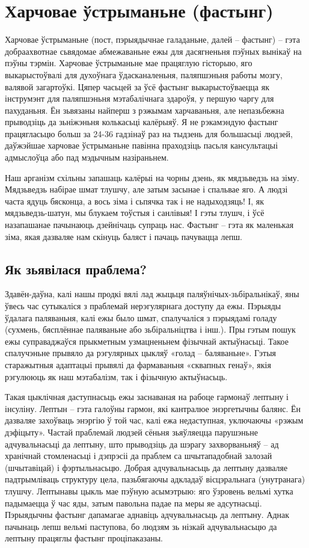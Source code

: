 \chapter{Харчовае ўстрыманьне (фастынг)}

Харчовае ўстрыманьне (пост, пэрыядычнае галаданьне, далей – фастынг) – гэта добраахвотнае сьвядомае абмежаваньне ежы для дасягненьня пэўных вынікаў на пэўны тэрмін. Харчовае ўстрыманьне мае працяглую гісторыю, яго выкарыстоўвалі для духоўнага ўдасканаленьня, паляпшэньня работы мозгу, валявой загартоўкі. Цяпер часьцей за ўсё фастынг выкарыстоўваецца як інструмэнт для паляпшэньня мэтабалічнага здароўя, у першую чаргу для пахуданьня. Ён зьвязаны найперш з рэжымам харчаваньня, але непазьбежна прыводзіць да зьніжэньня колькасьці калёрыяў. Я не рэкамэндую фастынг працягласьцю больш за 24-36 гадзінаў раз на тыдзень для большасьці людзей, даўжэйшае харчовае ўстрыманьне павінна праходзіць пасьля кансультацыі адмыслоўца або пад мэдычным назіраньнем.

Наш арганізм схільны запашаць калёрыі на чорны дзень, як мядзьведзь на зіму. Мядзьведзь набірае шмат тлушчу, але затым засынае і спальвае яго. А людзі часта ядуць бясконца, а вось зіма і сьпячка так і не надыходзяць! І, як мядзьведзь-шатун, мы блукаем тоўстыя і санлівыя! І гэты тлушч, і ўсё назапашанае пачынаюць дзейнічаць супраць нас. Фастынг – гэта як маленькая зіма, якая дазваляе нам скінуць баляст і пачаць пачувацца лепш.

\section{Як зьявілася праблема?}

Здавён-даўна, калі нашы продкі вялі лад жыцьця паляўнічых-зьбіральнікаў, яны ўвесь час сутыкаліся з праблемай нерэгулярнага доступу да ежы. Пэрыяды ўдалага паляваньня, калі ежы было шмат, спалучаліся з пэрыядамі голаду (сухмень, бясплённае паляваньне або зьбіральніцтва і інш.). Пры гэтым пошук ежы суправаджаўся прыкметным узмацненьнем фізычнай актыўнасьці. Такое спалучэньне прывяло да рэгулярных цыкляў «голад – баляваньне». Гэтыя старажытныя адаптацыі прывялі да фармаваньня «сквапных генаў», якія рэгулююць як наш мэтабалізм, так і фізычную актыўнасьць.

Такая цыклічная даступнасьць ежы заснаваная на рабоце гармонаў лептыну і інсуліну. Лептын – гэта галоўны гармон, які кантралюе энэргетычны балянс. Ён дазваляе захоўваць энэргію ў той час, калі ежа недаступная, уключаючы «рэжым дэфіцыту». Частай праблемай людзей сёньня зьяўляецца парушэньне адчувальнасьці да лептыну, што прыводзіць да шэрагу захворваньняў – ад хранічнай стомленасьці і дэпрэсіі да праблем са шчытападобнай залозай (шчытавіцай) і фэртыльнасьцю. Добрая адчувальнасьць да лептыну дазваляе падтрымліваць структуру цела, пазьбягаючы адкладаў вісцэральнага (унутранага) тлушчу. Лептынавы цыкль мае пэўную асымэтрыю: яго ўзровень вельмі хутка падымаецца ў час яды, затым павольна падае па меры яе адсутнасьці. Пэрыядычны фастынг дапамагае аднавіць адчувальнасьць да лептыну. Аднак пачынаць лепш вельмі паступова, бо людзям зь нізкай адчувальнасьцю да лептыну працяглы фастынг проціпаказаны.

